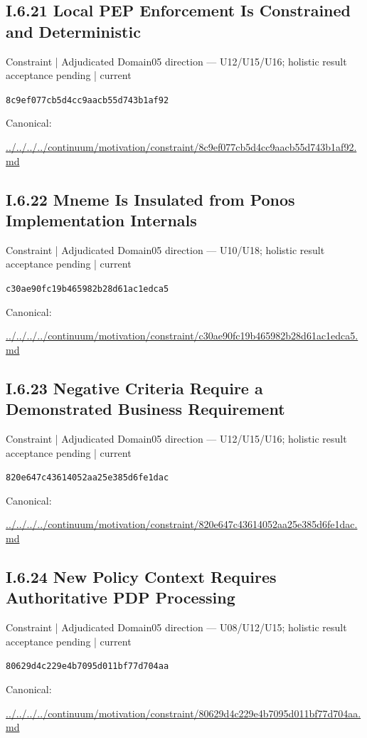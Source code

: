 \documentclass[10pt,a4paper]{article}
\begin{document}
\subsection*{I.6.21 Local PEP Enforcement Is Constrained and Deterministic}
\label{element-8c9ef077cb5d4cc9aacb55d743b1af92}
{\small Constraint | Adjudicated Domain05 direction — U12/U15/U16; holistic result acceptance pending | current}\par
\texttt{8c9ef077cb5d4cc9aacb55d743b1af92}\par
Canonical: \par
{\footnotesize\url{../../../../continuum/motivation/constraint/8c9ef077cb5d4cc9aacb55d743b1af92.md}}\par
\subsection*{I.6.22 Mneme Is Insulated from Ponos Implementation Internals}
\label{element-c30ae90fc19b465982b28d61ac1edca5}
{\small Constraint | Adjudicated Domain05 direction — U10/U18; holistic result acceptance pending | current}\par
\texttt{c30ae90fc19b465982b28d61ac1edca5}\par
Canonical: \par
{\footnotesize\url{../../../../continuum/motivation/constraint/c30ae90fc19b465982b28d61ac1edca5.md}}\par
\subsection*{I.6.23 Negative Criteria Require a Demonstrated Business Requirement}
\label{element-820e647c43614052aa25e385d6fe1dac}
{\small Constraint | Adjudicated Domain05 direction — U12/U15/U16; holistic result acceptance pending | current}\par
\texttt{820e647c43614052aa25e385d6fe1dac}\par
Canonical: \par
{\footnotesize\url{../../../../continuum/motivation/constraint/820e647c43614052aa25e385d6fe1dac.md}}\par
\subsection*{I.6.24 New Policy Context Requires Authoritative PDP Processing}
\label{element-80629d4c229e4b7095d011bf77d704aa}
{\small Constraint | Adjudicated Domain05 direction — U08/U12/U15; holistic result acceptance pending | current}\par
\texttt{80629d4c229e4b7095d011bf77d704aa}\par
Canonical: \par
{\footnotesize\url{../../../../continuum/motivation/constraint/80629d4c229e4b7095d011bf77d704aa.md}}\par
\end{document}
